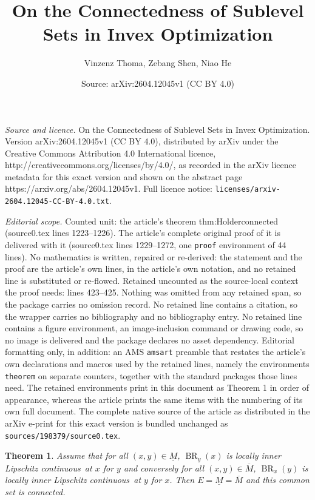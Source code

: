 \documentclass[10pt,a4paper]{amsart}
\title{On the Connectedness of Sublevel Sets in Invex Optimization}
\author{Vinzenz Thoma, Zebang Shen, Niao He}
\date{Source: arXiv:2604.12045v1 (CC BY 4.0)}
\newtheorem{theorem}{Theorem}
\DeclareMathOperator{\BR}{BR}
\newcommand{\lilc}{locally inner Lipschitz continuous}
\begin{document}
\maketitle

\noindent\emph{Source and licence.} On the Connectedness of Sublevel Sets in Invex Optimization. Version arXiv:2604.12045v1 (CC BY 4.0), distributed by arXiv under the Creative Commons Attribution 4.0 International licence, http://creativecommons.org/licenses/by/4.0/, as recorded in the arXiv licence metadata for this exact version and shown on the abstract page https://arxiv.org/abs/2604.12045v1. Full licence notice: \texttt{licenses/arxiv-2604.12045-CC-BY-4.0.txt}.\par\smallskip

\noindent\textit{Editorial scope.} Counted unit: the article's theorem thm:Holderconnected (source0.tex lines 1223--1226). The article's complete original proof of it is delivered with it (source0.tex lines 1229--1272, one \texttt{proof} environment of 44 lines). No mathematics is written, repaired or re-derived: the statement and the proof are the article's own lines, in the article's own notation, and no retained line is substituted or re-flowed.  Retained uncounted as the source-local context the proof needs: lines 423--425.  Nothing was omitted from any retained span, so the package carries no omission record.  No retained line contains a citation, so the wrapper carries no bibliography and no bibliography entry.  No retained line contains a figure environment, an image-inclusion command or drawing code, so no image is delivered and the package declares no asset dependency.  Editorial formatting only, in addition: an AMS \texttt{amsart} preamble that restates the article's own declarations and macros used by the retained lines, namely the environments \texttt{theorem} on separate counters, together with the standard packages those lines need.  The retained environments print in this document as Theorem 1 in order of appearance, whereas the article prints the same items with the numbering of its own full document.  The complete native source of the article as distributed in the arXiv e-print for this exact version is bundled unchanged as \texttt{sources/198379/source0.tex}.
\begin{theorem}
\label{thm:lilc} Assume that for all $(x,y)\in \underline{M}$, $\BR_y(x)$ is \lilc\ at $x$ for $y$ and conversely for all $(x,y)\in \overline{M}$, $\BR_x(y)$ is \lilc\ at $y$ for $x$. Then $E=\underline{M}=\overline{M}$ and this common set is connected.
\end{theorem}
\end{document}
